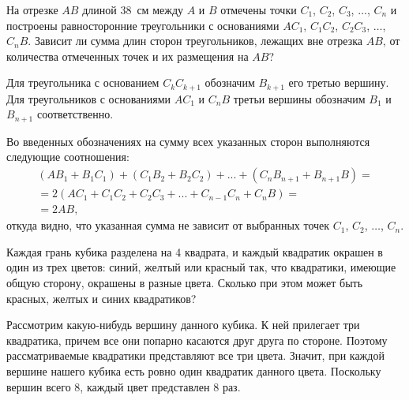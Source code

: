 \begin{itemize}

\itB На отрезке $AB$ длиной \SI{38}{\textrm{см}} между $A$ и $B$ отмечены точки $C_1$, $C_2$, $C_3$, $\dots$, $C_n$ 
и построены равносторонние треугольники с основаниями $AC_1$, $C_1C_2$, $C_2C_3$, $\dots$, $C_nB$. 
Зависит ли сумма длин сторон треугольников, лежащих вне отрезка $AB$, от количества отмеченных точек и их размещения на $AB$?

\itr Для треугольника с основанием $C_{k}C_{k+1}$ обозначим $B_{k+1}$ его третью вершину. Для треугольников с основаниями $AC_1$ и $C_nB$ третьи вершины обозначим $B_1$ и $B_{n+1}$ соответственно. 

\begin{center}\end{center}

Во введенных обозначениях на сумму всех указанных сторон выполняются следующие соотношения:
$$
\begin{array}{l}
(AB_1+B_1C_1)+(C_1B_2+B_2C_2)+...+(C_nB_{n+1}+B_{n+1}B)=\\
=2(AC_1+C_1C_2+C_2C_3+...+C_{n-1}C_n+C_nB)=\\
=2AB,
\end{array}$$
откуда видно, что указанная сумма не зависит от выбранных точек $C_1$, $C_2$, $\dots$, $C_n$.


\itC Каждая грань кубика разделена на 4 квадрата, и каждый квадратик окрашен в один из трех цветов: синий, желтый или красный так, что квадратики, имеющие общую сторону, окрашены в разные цвета. Сколько при этом может быть красных, желтых и синих квадратиков?

\itr Рассмотрим какую-нибудь вершину данного кубика. 
К ней прилегает три квадратика, причем все они попарно касаются друг друга по стороне. 
Поэтому рассматриваемые квадратики представляют все три цвета. Значит, при каждой вершине 
нашего кубика есть ровно один квадратик данного цвета. Поскольку вершин всего 8, каждый 
цвет представлен 8 раз.

\end{itemize}
